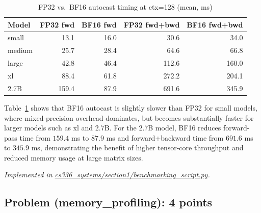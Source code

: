 \documentclass[letterpaper]{article}
\newcommand{\repofile}[2]{\href{https://github.com/echung32/ece405-assignment4-hpc/blob/main/#1}{#2}}
\begin{document}
\begin{itemize}
		\begin{table}[H]
			\centering
			\caption{FP32 vs.\ BF16 autocast timing at ctx=128 (mean, ms)}
			\label{tab:bf16-timing}
			\begin{tabular}{lrrrr}
				\hline
				Model & FP32 fwd & BF16 fwd & FP32 fwd+bwd & BF16 fwd+bwd \\
				\hline
				small  & 13.1 & 16.0 & 30.6 & 34.0 \\
				medium & 25.7 & 28.4 & 64.6 & 66.8 \\
				large  & 42.8 & 46.4 & 112.6 & 160.0 \\
				xl     & 88.4 & 61.8 & 272.2 & 204.1 \\
				2.7B   & 159.4 & 87.9 & 691.6 & 345.9 \\
				\hline
			\end{tabular}
		\end{table}
		
		Table~\ref{tab:bf16-timing} shows that BF16 autocast is slightly slower than FP32 for small models, where mixed-precision overhead dominates, but becomes substantially faster for larger models such as xl and 2.7B. For the 2.7B model, BF16 reduces forward-pass time from \(159.4\) ms to \(87.9\) ms and forward+backward time from \(691.6\) ms to \(345.9\) ms, demonstrating the benefit of higher tensor-core throughput and reduced memory usage at large matrix sizes.
		
	\end{itemize}
	
	\textit{Implemented in  \repofile{cs336_systems/section1/benchmarking_script.py}{cs336\_systems/section1/benchmarking\_script.py}.}
	
	\subsection{Problem (memory\_profiling): 4 points}
	
\end{document}
